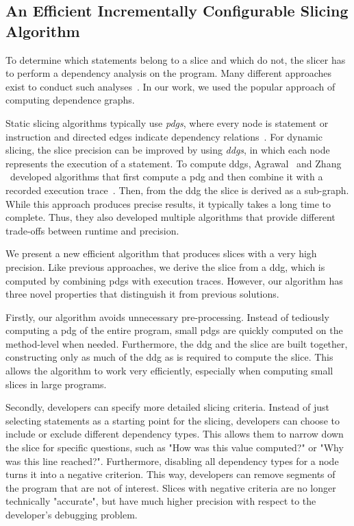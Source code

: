 \subsection{An Efficient Incrementally Configurable Slicing Algorithm}

To determine which statements belong to a slice and which do not, the slicer has to perform a dependency analysis on the program.
Many different approaches exist to conduct such analyses~\cite{korel_98_dynamic_program_slicing_methods, tip_94_a_survey_of_program}. 
In our work, we used the popular approach of computing dependence graphs.

Static slicing algorithms typically use \emph{\acp{pdg}}, where every node is statement or instruction and directed edges indicate dependency relations~\cite{weiser_81_program_slicing}.
For dynamic slicing, the slice precision can be improved by using \emph{\acp{ddg}}, in which each node represents the execution of a statement.
To compute \acp{ddg}, Agrawal \etal\ and Zhang \etal\ developed algorithms that first compute a \ac{pdg} and then combine it with a recorded execution trace~\cite{agrawal_90_dynamic_program_slicing,zhang_03_precise_dynamic_slicing_algorithms}.
Then, from the \ac{ddg} the slice is derived as a sub-graph.
While this approach produces precise results, it typically takes a long time to complete.
Thus, they also developed multiple algorithms that provide different trade-offs between runtime and precision.

We present a new efficient algorithm that produces slices with a very high precision.
Like previous approaches, we derive the slice from a \ac{ddg}, which is computed by combining \acp{pdg} with execution traces.
However, our algorithm has three novel properties that distinguish it from previous solutions.

Firstly, our algorithm avoids unnecessary pre-processing.
Instead of tediously computing a \ac{pdg} of the entire program, small \acp{pdg} are quickly computed on the method-level when needed.
Furthermore, the \ac{ddg} and the slice are built together, constructing only as much of the \ac{ddg} as is required to compute the slice.
This allows the algorithm to work very efficiently, especially when computing small slices in large programs.

Secondly, developers can specify more detailed slicing criteria.
Instead of just selecting statements as a starting point for the slicing, developers can choose to include or exclude different dependency types.
This allows them to narrow down the slice for specific questions, such as "How was this value computed?" or "Why was this line reached?".
Furthermore, disabling all dependency types for a node turns it into a negative criterion.
This way, developers can remove segments of the program that are not of interest.
Slices with negative criteria are no longer technically "accurate", but have much higher precision with respect to the developer's debugging problem.

